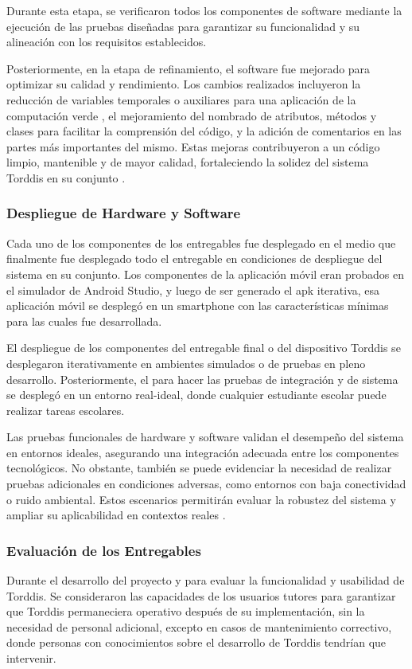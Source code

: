 \documentclass[a4paper,fleqn]{cas-sc}
\begin{document}
				Durante esta etapa, se verificaron todos los componentes de software mediante la ejecución de las pruebas diseñadas para garantizar su funcionalidad y su alineación con los requisitos establecidos.
			
				Posteriormente, en la etapa de refinamiento, el software fue mejorado para optimizar su calidad y rendimiento. Los cambios realizados incluyeron la reducción de variables temporales o auxiliares para una aplicación de la computación verde \citep{Firmansyah2024Integrating}, el mejoramiento del nombrado de atributos, métodos y clases para facilitar la comprensión del código, y la adición de comentarios en las partes más importantes del mismo. Estas mejoras contribuyeron a un código limpio, mantenible y de mayor calidad, fortaleciendo la solidez del sistema Torddis en su conjunto \citep{Marabesi2024Exploring}.
			
			\subsubsection{Despliegue de Hardware y Software}
				Cada uno de los componentes de los entregables fue  desplegado en el medio que finalmente fue desplegado todo el entregable en condiciones de despliegue del sistema en su conjunto. Los componentes de la aplicación móvil eran probados en el simulador de Android Studio, y luego de ser generado el apk iterativa, esa aplicación móvil se desplegó en un smartphone con las características mínimas para las cuales fue desarrollada.
			
				El despliegue de los componentes del entregable final o del dispositivo Torddis se desplegaron iterativamente en ambientes simulados o de pruebas en pleno desarrollo. Posteriormente, el para hacer las pruebas de integración y de sistema se desplegó en un entorno real-ideal, donde cualquier estudiante escolar puede realizar tareas escolares.
			
				Las pruebas funcionales de hardware y software validan el desempeño del sistema en entornos ideales, asegurando una integración adecuada entre los componentes tecnológicos. No obstante, también se puede evidenciar la necesidad de realizar pruebas adicionales en condiciones adversas, como entornos con baja conectividad o ruido ambiental. Estos escenarios permitirán evaluar la robustez del sistema y ampliar su aplicabilidad en contextos reales \citep{Falzetti2024Promoting}.
				
			\subsubsection{Evaluación de los Entregables}
				Durante el desarrollo del proyecto y para evaluar la funcionalidad y usabilidad de Torddis. Se consideraron las capacidades de los usuarios tutores para garantizar que Torddis permaneciera operativo después de su implementación, sin la necesidad de personal adicional, excepto en casos de mantenimiento correctivo, donde personas con conocimientos sobre el desarrollo de Torddis tendrían que intervenir.
			
\end{document}
